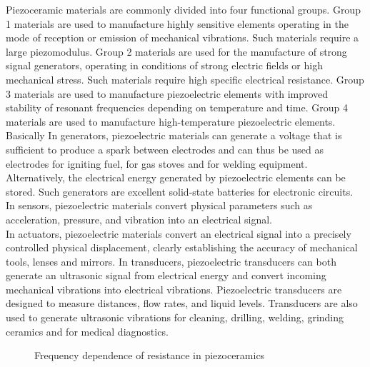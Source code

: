 \documentclass[a4paper,14pt]{extreport}
\begin{document}
Piezoceramic materials are commonly divided into four functional groups. Group 1 materials are used to manufacture highly sensitive elements operating in the mode of reception or emission of mechanical vibrations. Such materials require a large piezomodulus. Group 2 materials are used for the manufacture of strong signal generators, operating in conditions of strong electric fields or high mechanical stress. Such materials require high specific electrical resistance. Group 3 materials are used to manufacture piezoelectric elements with improved stability of resonant frequencies depending on temperature and time. Group 4 materials are used to manufacture high-temperature piezoelectric elements.\\

Basically 
In generators, piezoelectric materials can generate a voltage that is sufficient to produce a spark between electrodes and can thus be used as electrodes for igniting fuel, for gas stoves and for welding equipment. Alternatively, the electrical energy generated by piezoelectric elements can be stored. Such generators are excellent solid-state batteries for electronic circuits.\\

In sensors, piezoelectric materials convert physical parameters such as acceleration, pressure, and vibration into 
an electrical signal.\\

In actuators, piezoelectric materials convert an electrical signal into a precisely controlled physical displacement, clearly establishing the accuracy of mechanical tools, lenses and mirrors.
In transducers, piezoelectric transducers can both generate an ultrasonic signal from electrical energy and convert incoming mechanical vibrations into electrical vibrations. Piezoelectric transducers are designed to measure distances, flow rates, and liquid levels. Transducers are also used to generate ultrasonic vibrations for cleaning, drilling, welding, grinding ceramics and for medical diagnostics.\\


\begin{figure}[h]
\caption{Frequency dependence of resistance in piezoceramics}
\end{figure}
\end{document}
